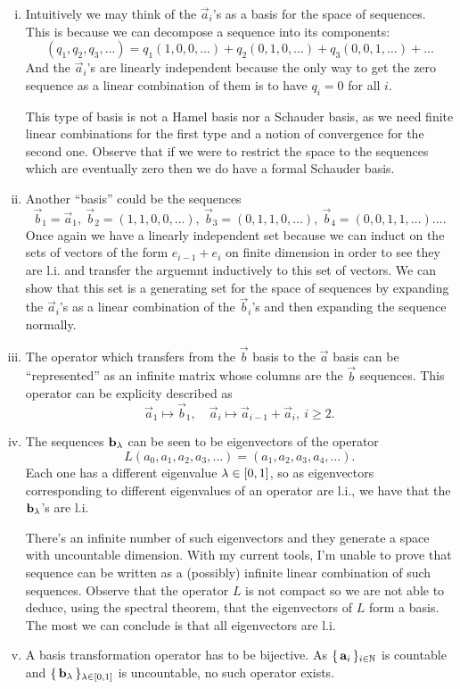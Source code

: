 \documentclass[12pt]{memoir}
\begin{document}
\begin{ptcbr}
    \begin{enumerate}[(i)]
        \item Intuitively we may think of the $\vec a_i$'s as a basis for the space of sequences. This is because we can decompose a sequence into its components:
        $$(q_1,q_2,q_3,\dots)=q_1(1,0,0,\dots)+q_2(0,1,0,\dots)+q_3(0,0,1,\dots)+\dots$$
        And the $\vec a_i$'s are linearly independent because the only way to get the zero sequence as a linear combination of them is to have $q_i=0$ for all $i$.\par 
        This type of basis is not a Hamel basis nor a Schauder basis, as we need finite linear combinations for the first type and a notion of convergence for the second one. Observe that if we were to restrict the space to the sequences which are eventually zero then we do have a formal Schauder basis.
        \item Another ``basis'' could be the sequences 
        $$\vec b_1=\vec a_1,\ \vec b_2=(1,1,0,0,\dots),\ \vec b_3=(0,1,1,0,\dots),\ \vec b_4=(0,0,1,1,\dots).\dots$$
        Once again we have a linearly independent set because we can induct on the sets of vectors of the form $e_{i-1}+e_{i}$ on finite dimension in order to see they are l.i. and transfer the arguemnt inductively to this set of vectors. We can show that this set is a generating set for the space of sequences by expanding the $\vec a_i$'s as a linear combination of the $\vec b_i$'s and then expanding the sequence normally. 
        \item The operator which transfers from the $\vec b$ basis to the $\vec a$ basis can be ``represented'' as an infinite matrix whose columns are the $\vec b$ sequences. This operator can be explicity described as 
        $$\vec a_1\mapsto\vec b_1,\quad \vec a_i\mapsto\vec a_{i-1}+\vec a_{i},\ i\geq 2.$$
        \item The sequences $\mathbf{b}_\lambda$ can be seen to be eigenvectors of the operator 
        $$L(a_0,a_1,a_2,a_3,\dots)=(a_1,a_2,a_3,a_4,\dots).$$
        Each one has a different eigenvalue $\lambda\in\left\lbrack0,1\right\rbrack$, so as eigenvectors corresponding to different eigenvalues of an operator are l.i., we have that the $\mathbf{b}_\lambda$'s are l.i.\par 
        There's an infinite number of such eigenvectors and they generate a space with uncountable dimension. With my current tools, I'm unable to prove that sequence can be written as a (possibly) infinite linear combination of such sequences. Observe that the operator $L$ is not compact so we are not able to deduce, using the spectral theorem, that the eigenvectors of $L$ form a basis. The most we can conclude is that all eigenvectors are l.i.
        \item A basis transformation operator has to be bijective. As $\{\,\mathbf{a}_i\,\}_{i\in\mathbb{N}}$ is countable and $\{\,\mathbf{b}_\lambda\,\}_{\lambda\in\left\lbrack0,1\right\rbrack}$ is uncountable, no such operator exists.
    \end{enumerate}
\end{ptcbr}
\end{document}

